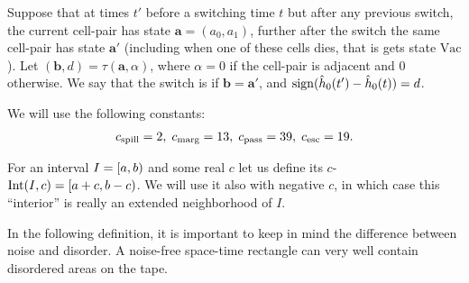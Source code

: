 \documentclass[11pt]{memoir}
\theoremstyle{definition} %
\renewcommand{\vek}[1]{\mathbf{#1}}
\newcommand{\va}{\vek{a}} %
\newcommand{\hc}{\hat h}
\newcommand{\Int}{\mathrm{Int}} %
\newcommand{\Vacant}{\mathrm{Vac}}
\newcommand{\cns}[1]{c_{\textrm{\upshape #1}}}
\newcommand{\CEsc}{\cns{esc}}
\newcommand{\CMarg}{\cns{marg}}
\newcommand{\CPass}{\cns{pass}}
\newcommand{\CSpill}{\cns{spill}}
\begin{document}
\begin{definition}
Suppose that at times \( t' \) before a switching time \( t \) but after 
any previous switch, the current cell-pair has state \( \va = (a_{0},a_{1})\),
further after the switch the same cell-pair has state \( \va' \)
(including when one of these cells dies, that is gets state \( \Vacant \)).
Let \( (\vek{b},d) =\tau(\va,\alpha) \), where \( \alpha=0 \) if the cell-pair is adjacent and 0 otherwise.
We say that the switch is  if \( \vek{b}=\va' \), and
\( \sign(\hc_{0}(t')-\hc_{0}(t)) = d \).
\end{definition}

We will use the following constants:
\begin{align}\label{eq:cns.traj}
  \CSpill =2,\;
  \CMarg = 13,\;
  \CPass = 39,\;
  \CEsc = 19.
 \end{align}


 \begin{definition}\label{def:interior}
  For an interval \( I=\left[a,b\right) \) and some real \( c \) let us define its \( c \)-
  \(  \Int(I,c) = \lint{a+c}{b-c} \).
  We will use it also  with negative \( c \), in which case this ``interior'' is really an extended
  neighborhood of \( I \).
 \end{definition}

  In the following definition, it is important to keep in mind the difference between noise and disorder.
  A noise-free space-time rectangle can very well contain disordered areas on the tape.
  
\end{document}
